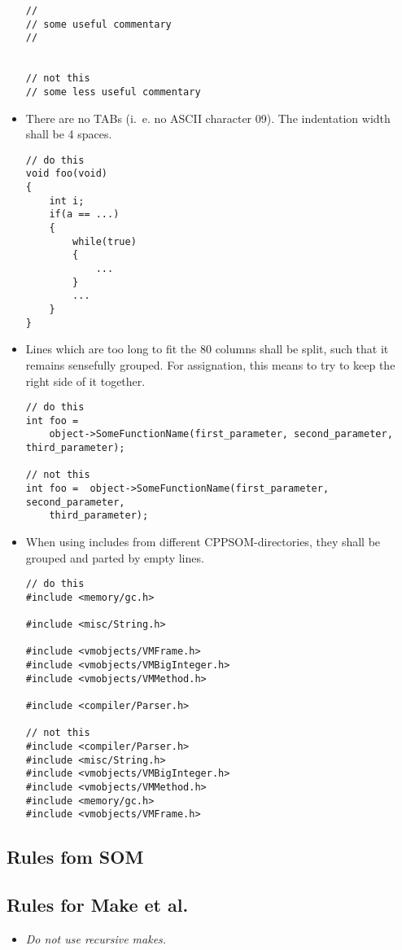\documentclass{scrartcl}
\begin{document}
\begin{itemize}
\begin{lstlisting}
//
// some useful commentary
//


// not this
// some less useful commentary
\end{lstlisting}
\item There are no TABs (i.~e. no ASCII character 09). The indentation
  width shall be 4 spaces.
\begin{lstlisting}[showspaces]
// do this
void foo(void) 
{
    int i;
    if(a == ...) 
    {
        while(true) 
        {
            ...
        }
        ...
    }
}
\end{lstlisting}

\item Lines which are too long to fit the 80 columns shall be split, such
  that it remains sensefully grouped. For assignation, this means to try
  to keep the right side of it together.
  \begin{lstlisting}
// do this
int foo =
    object->SomeFunctionName(first_parameter, second_parameter, third_parameter);

// not this
int foo =  object->SomeFunctionName(first_parameter, second_parameter,
    third_parameter);
  \end{lstlisting}
\item When using includes from different CPPSOM-directories, they shall
  be grouped and parted by empty lines.
  \begin{lstlisting}
// do this
#include <memory/gc.h>

#include <misc/String.h>

#include <vmobjects/VMFrame.h>
#include <vmobjects/VMBigInteger.h>
#include <vmobjects/VMMethod.h>

#include <compiler/Parser.h>

// not this
#include <compiler/Parser.h>
#include <misc/String.h>
#include <vmobjects/VMBigInteger.h>
#include <vmobjects/VMMethod.h>
#include <memory/gc.h>
#include <vmobjects/VMFrame.h>
\end{lstlisting}
\end{itemize}

\subsection{Rules fom SOM}
\label{sec:rules-fom-som}

\subsection{Rules for Make et al.}
\label{sec:rules-make-et}

\begin{itemize}
\item \emph{Do not use recursive makes.}
\end{itemize}
\end{document}
